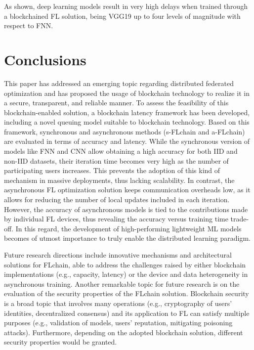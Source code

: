 \documentclass[lettersize,journal]{IEEEtran}
\begin{document}
As shown, deep learning models result in very high delays when trained through a blockchained FL solution, being VGG19 up to four levels of magnitude with respect to FNN.

\section{Conclusions}
\label{section:conclusions}
This paper has addressed an emerging topic regarding distributed federated optimization and has proposed the usage of blockchain technology to realize it in a secure, transparent, and reliable manner. To assess the feasibility of this blockchain-enabled solution, a blockchain latency framework has been developed, including a novel queuing model suitable to blockchain technology. Based on this framework, synchronous and asynchronous methods (s-FLchain and a-FLchain) are evaluated in terms of accuracy and latency. While the synchronous version of models like FNN and CNN allow obtaining a high accuracy for both IID and non-IID datasets, their iteration time becomes very high as the number of participating users increases. This prevents the adoption of this kind of mechanism in massive deployments, thus lacking scalability. In contrast, the asynchronous FL optimization solution keeps communication overheads low, as it allows for reducing the number of local updates included in each iteration. However, the accuracy of asynchronous models is tied to the contributions made by individual FL devices, thus revealing the accuracy versus training time trade-off. In this regard, the development of high-performing lightweight ML models becomes of utmost importance to truly enable the distributed learning paradigm.

Future research directions include innovative mechanisms and architectural solutions for FLchain, able to address the challenges raised by either blockchain implementations (e.g., capacity, latency) or the device and data heterogeneity in asynchronous training. Another remarkable topic for future research is on the evaluation of the security properties of the FLchain solution. Blockchain security is a broad topic that involves many operations (e.g., cryptography of users' identities, decentralized consensus) and its application to FL can satisfy multiple purposes (e.g., validation of models, users' reputation, mitigating poisoning attacks). Furthermore, depending on the adopted blockchain solution, different security properties would be granted.
\end{document}
